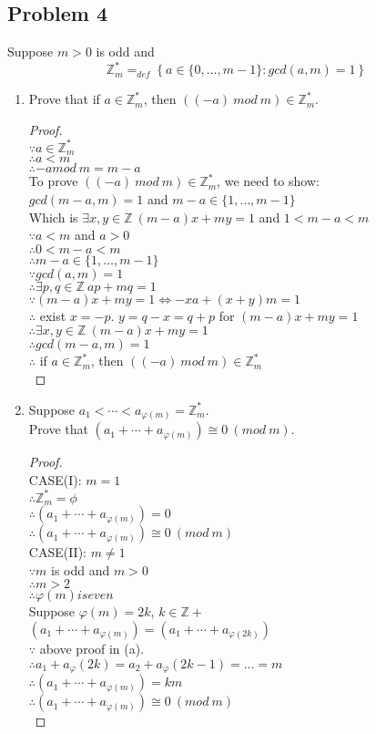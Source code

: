 \documentclass[paper=a4, fontsize=11pt]{scrartcl} %
\numberwithin{equation}{section} %
\numberwithin{figure}{section} %
\newcommand{\problem}[1]{\subsection *{Problem #1}}
\newcommand{\pnl}{$ $\newline\\}
\newcommand{\Z}{\mathbb{Z}}
\begin{document}
\problem 4 Suppose $m > 0$ is odd and
$$\Z^{*}_{m}=_{def} \left\{ a \in \{ 0, \dots , m - 1 \} : gcd(a, m) = 1 \right\}$$
\begin{enumerate}
\item Prove that if $a \in \Z^{*}_{m}$, then $((-a)\ mod\ m) \in \Z^{*}_{m}$.
\begin{proof}
\pnl
$\because a \in \Z^{*}_{m}$\\
$\therefore a < m$\\
$\therefore -a mod\ m = m-a$\\
To prove $((-a)\ mod\ m) \in \Z^{*}_{m}$, we need to show:\\
$gcd(m-a, m) = 1$ and $m-a \in \{ 1,\ldots,m-1 \}$\\
Which is $\exists x,y \in \Z \ (m-a)x+my = 1$ and $1 < m - a < m$ \\
$\because a < m$ and $a > 0$\\
$\therefore 0 < m - a < m $\\
$\therefore m-a \in \{ 1,\ldots,m-1 \}$\\
$\because gcd(a, m) = 1$\\
$\therefore \exists p,q \in \Z \ ap+mq = 1$\\
$\because (m-a)x+my = 1 \iff -xa + (x+y)m = 1$\\
$\therefore$ exist $x=-p$. $y = q -x = q+p$ for $(m-a)x+my = 1$\\
$\therefore \exists x,y \in \Z \ (m-a)x+my = 1$\\
$\therefore gcd(m-a, m) = 1$\\
$\therefore$ if $a \in \Z^{*}_{m}$, then $((-a)\ mod\ m) \in \Z^{*}_{m}$\\

\end{proof}
\item Suppose ${ a_1 <\cdots< a_{\varphi(m)} } = \Z^{*}_{m}$.\\
Prove that $(a_1 +\cdots+ a_{\varphi(m)}) \cong 0\ (mod\ m)$.
\begin{proof}
\pnl
CASE(I): $m = 1$ \\
$\therefore \Z^{*}_{m} = \phi$\\
$\therefore (a_1 +\cdots+ a_{\varphi(m)}) = 0$\\
$\therefore (a_1 +\cdots+ a_{\varphi(m)}) \cong 0\ (mod\ m)$\\

CASE(II): $m \neq 1$\\
$\because m$ is odd and $m > 0$\\
$\therefore m > 2$\\
$\therefore \varphi (m) is even$\\
Suppose $\varphi (m) = 2k$, $k \in \Z+$\\
$(a_1 +\cdots+ a_{\varphi(m)}) = (a_1 +\cdots+ a_{\varphi(2k)})$\\
$\because$ above proof in (a).\\
$\therefore a_1 + a_\varphi(2k) = a_2 + a_\varphi(2k-1) = \ldots = m$\\
$\therefore (a_1 +\cdots+ a_{\varphi(m)}) = km$\\
$\therefore (a_1 +\cdots+ a_{\varphi(m)}) \cong 0\ (mod\ m)$\\


\end{proof}
\end{enumerate}
\end{document}
